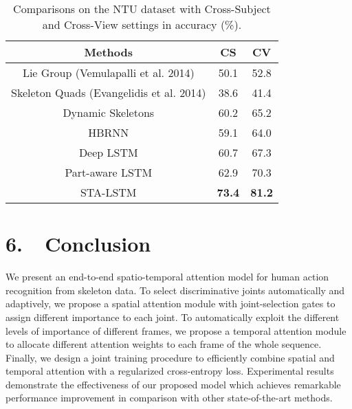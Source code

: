 \documentclass[letterpaper]{article}
\begin{document}
\begin{table}[htbp]
	\fontsize{8pt}{9pt}\selectfont\centering
	\begin{center}
		\caption{Comparisons on the NTU dataset with Cross-Subject and Cross-View settings in accuracy (\%).} \label{table:NTU}
		\vspace{-2mm}
		\begin{tabular}{c|c|c}
			\hline
			Methods & CS  & CV \\
			\hline
			Lie Group (Vemulapalli et al. 2014) & 50.1  & 52.8\\ \hline
			Skeleton Quads (Evangelidis et al. 2014)  & 38.6 & 41.4\\ \hline
			Dynamic Skeletons  \cite{hu2015jointly} & 60.2  & 65.2\\
			\hline
			HBRNN  \cite{CVPR15HRNN} & 59.1 &  64.0\\
			\hline
Deep LSTM \cite{Shahroudy_2016_CVPR} & 60.7  & 67.3\\
			\hline
			Part-aware LSTM   \cite{Shahroudy_2016_CVPR} & 62.9 & 70.3  \\
			\hline
\hline
STA-LSTM & \textbf{73.4} &  \textbf{81.2} \\ \hline
		\end{tabular}
	\end{center}
\vspace{-6mm}	
\end{table}





\section{6.~~Conclusion}
We present an end-to-end spatio-temporal attention model for human action recognition from skeleton data. To select discriminative joints automatically and adaptively, we propose a spatial attention module with joint-selection gates to assign different importance to each joint. To automatically exploit the different levels of importance of different frames, we propose a temporal attention module to allocate different attention weights to each frame of the whole sequence. Finally, we design a joint training procedure to efficiently combine spatial and temporal attention with a regularized cross-entropy loss. Experimental results demonstrate the effectiveness of our proposed model which achieves remarkable performance improvement in comparison with other state-of-the-art methods.
\end{document}
